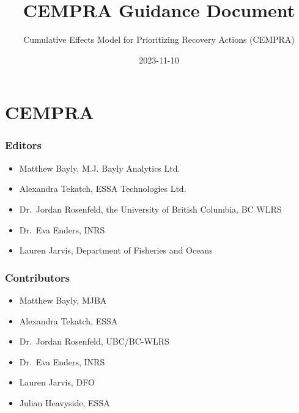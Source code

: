 \documentclass[
  letterpaper,
  DIV=11,
  numbers=noendperiod]{scrreprt}
\title{CEMPRA Guidance Document}
\subtitle{Cumulative Effects Model for Prioritizing Recovery Actions
(CEMPRA)}
\author{}
\date{2023-11-10}
\providecommand{\tightlist}{%
  \setlength{\itemsep}{0pt}\setlength{\parskip}{0pt}}\usepackage{longtable,booktabs,array}
\renewcommand*\contentsname{Table of contents}
\newcommand\contentsname{Table of contents}
\begin{document}
\maketitle
\ifdefined\Shaded\renewenvironment{Shaded}{\begin{tcolorbox}[boxrule=0pt, interior hidden, borderline west={3pt}{0pt}{shadecolor}, frame hidden, enhanced, sharp corners, breakable]}{\end{tcolorbox}}\fi

\renewcommand*\contentsname{Table of contents}
{
\hypersetup{linkcolor=}
\setcounter{tocdepth}{2}
\tableofcontents
}

\hypertarget{cempra}{%
\chapter*{CEMPRA}\label{cempra}}


\hypertarget{editors}{%
\subsection*{Editors}\label{editors}}

\begin{itemize}
\tightlist
\item
  Matthew Bayly, M.J. Bayly Analytics Ltd.
\item
  Alexandra Tekatch, ESSA Technologies Ltd.
\item
  Dr.~Jordan Rosenfeld, the University of British Columbia, BC WLRS
\item
  Dr.~Eva Enders, INRS
\item
  Lauren Jarvis, Department of Fisheries and Oceans
\end{itemize}

\hypertarget{contributors}{%
\subsection*{Contributors}\label{contributors}}

\begin{itemize}
\tightlist
\item
  Matthew Bayly, MJBA
\item
  Alexandra Tekatch, ESSA
\item
  Dr.~Jordan Rosenfeld, UBC/BC-WLRS
\item
  Dr.~Eva Enders, INRS
\item
  Lauren Jarvis, DFO
\item
  Julian Heavyside, ESSA
\end{itemize}
\end{document}
